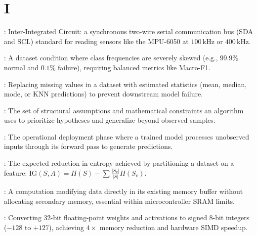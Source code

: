 \section*{I}
\begin{description}[leftmargin=!,labelwidth=4.5cm,itemsep=1.5ex]
\item[\textbf{I2C}\hfill \textnormal{\sffamily\scriptsize\color{keyideablue}[IoT \& Hardware]}]: Inter-Integrated Circuit: a synchronous two-wire serial communication bus (SDA and SCL) standard for reading sensors like the MPU-6050 at $100\,\text{kHz}$ or $400\,\text{kHz}$.
\item[\textbf{Imbalanced Data}\hfill \textnormal{\sffamily\scriptsize\color{keyideablue}[Data Engineering]}]: A dataset condition where class frequencies are severely skewed (e.g., $99.9\%$ normal and $0.1\%$ failure), requiring balanced metrics like Macro-F1.
\item[\textbf{Imputation}\hfill \textnormal{\sffamily\scriptsize\color{keyideablue}[Data Engineering]}]: Replacing missing values in a dataset with estimated statistics (mean, median, mode, or KNN predictions) to prevent downstream model failure.
\item[\textbf{Inductive Bias}\hfill \textnormal{\sffamily\scriptsize\color{keyideablue}[Machine Learning]}]: The set of structural assumptions and mathematical constraints an algorithm uses to prioritize hypotheses and generalize beyond observed samples.
\item[\textbf{Inference}\hfill \textnormal{\sffamily\scriptsize\color{keyideablue}[Machine Learning]}]: The operational deployment phase where a trained model processes unobserved inputs through its forward pass to generate predictions.
\item[\textbf{Information Gain}\hfill \textnormal{\sffamily\scriptsize\color{keyideablue}[Classical ML]}]: The expected reduction in entropy achieved by partitioning a dataset on a feature: $\text{IG}(S, A) = H(S) - \sum \frac{|S_v|}{|S|} H(S_v)$.
\item[\textbf{In-place Operation}\hfill \textnormal{\sffamily\scriptsize\color{keyideablue}[Software Engineering]}]: A computation modifying data directly in its existing memory buffer without allocating secondary memory, essential within microcontroller SRAM limits.
\item[\textbf{Integer Quantization (Int8)}\hfill \textnormal{\sffamily\scriptsize\color{keyideablue}[TinyML]}]: Converting 32-bit floating-point weights and activations to signed 8-bit integers ($-128$ to $+127$), achieving $4\times$ memory reduction and hardware SIMD speedup.

\end{description}
